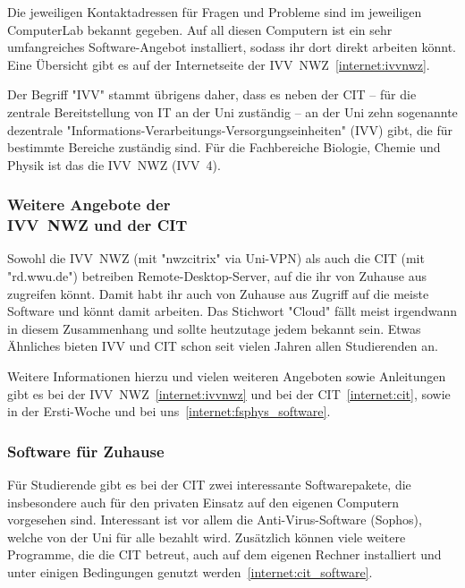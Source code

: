\begin{multicols}{2}
Die jeweiligen Kontaktadressen für Fragen und Probleme sind im jeweiligen ComputerLab bekannt gegeben.
Auf all diesen Computern ist ein sehr umfangreiches Software-Angebot installiert, sodass ihr dort direkt arbeiten könnt.
Eine Übersicht gibt es auf der Internetseite der IVV~NWZ~\cref{internet:ivvnwz}.

Der Begriff "IVV" stammt übrigens daher, dass es neben der CIT -- für die zentrale Bereitstellung von IT an der Uni zuständig -- an der Uni zehn sogenannte dezentrale "Informations-Verarbeitungs-Versorgungseinheiten" (IVV) gibt, die für bestimmte Bereiche zuständig sind.
Für die Fachbereiche Biologie, Chemie und Physik ist das die IVV~NWZ (IVV~4).

\subsubsection[Weitere Angebote der IVV~NWZ und der CIT]{Weitere Angebote der\\IVV~NWZ und der CIT}
Sowohl die IVV~NWZ (mit "nwzcitrix" via Uni-VPN) als auch die CIT (mit "rd.wwu.de") betreiben Remote-Desktop-Server, auf die ihr von Zuhause aus zugreifen könnt.
Damit habt ihr auch von Zuhause aus Zugriff auf die meiste Software und könnt damit arbeiten.
Das Stichwort "Cloud" fällt meist irgendwann in diesem Zusammenhang und sollte heutzutage jedem bekannt sein.
Etwas Ähnliches bieten IVV und CIT schon seit vielen Jahren allen Studierenden an.

Weitere Informationen hierzu und vielen weiteren Angeboten sowie Anleitungen gibt es bei der IVV~NWZ~\cref{internet:ivvnwz} und bei der CIT~\cref{internet:cit}, sowie in der Ersti-Woche und bei uns~\cref{internet:fsphys_software}.

\subsubsection{Software für Zuhause}
Für Studierende gibt es bei der CIT zwei interessante Softwarepakete, die insbesondere auch für den privaten Einsatz auf den eigenen Computern vorgesehen sind.
Interessant ist vor allem die Anti-Virus-Software (Sophos), welche von der Uni für alle bezahlt wird.
Zusätzlich können viele weitere Programme, die die CIT betreut, auch auf dem eigenen Rechner installiert und unter einigen Bedingungen genutzt werden~\cref{internet:cit_software}.


\end{multicols}
